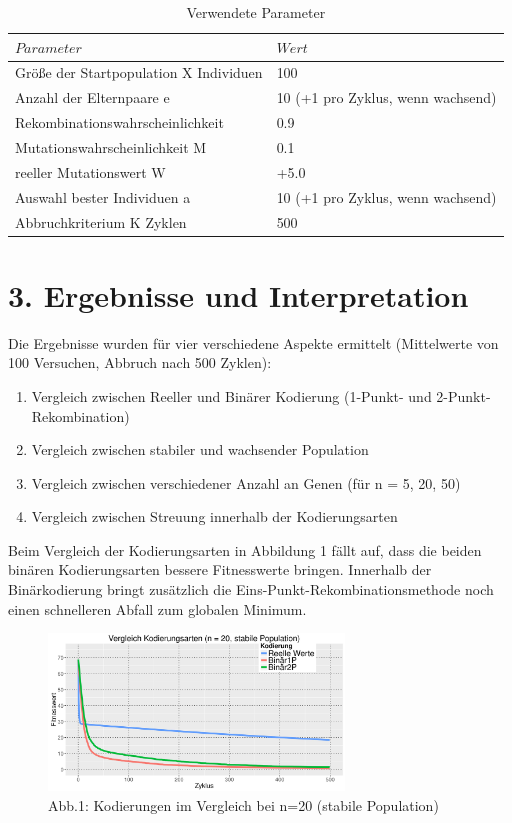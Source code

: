 \documentclass[12pt,
    a4paper,
    headinclude,
    footinclude]{scrreprt}
\begin{document}
\begin{table}[h]
	\centering
	\caption*{Verwendete Parameter}
	\begin{tabularx}{14cm}{|p{9cm}|X|}
		\hline
		$Parameter$ & $Wert$ \\
		\hline
		\hline
		Größe der Startpopulation X Individuen& 100  \\
				\hline
		Anzahl der Elternpaare e & 10 (+1 pro Zyklus, wenn wachsend)  \\
				\hline
		Rekombinationswahrscheinlichkeit& 0.9 \\
				\hline
		Mutationswahrscheinlichkeit M & 0.1 \\
				\hline
		reeller Mutationswert W& +5.0  \\
				\hline
		Auswahl bester Individuen a& 10 (+1 pro Zyklus, wenn wachsend) \\
		\hline
		Abbruchkriterium K Zyklen & 500\\
		\hline
	\end{tabularx}
\end{table}


	
\section*{3. Ergebnisse und Interpretation}	

Die Ergebnisse wurden für vier verschiedene Aspekte ermittelt (Mittelwerte von 100 Versuchen, Abbruch nach 500 Zyklen):

\begin{enumerate}
	\item Vergleich zwischen Reeller und Binärer Kodierung (1-Punkt- und 2-Punkt-Rekombination)
    \item Vergleich zwischen stabiler und wachsender Population
    \item Vergleich zwischen verschiedener Anzahl an Genen (für n = 5, 20, 50)
    \item Vergleich zwischen Streuung innerhalb der Kodierungsarten 
\end{enumerate}

Beim Vergleich der Kodierungsarten in Abbildung 1 fällt auf, dass die beiden binären Kodierungsarten bessere Fitnesswerte bringen. Innerhalb der Binärkodierung bringt zusätzlich die Eins-Punkt-Rekombinationsmethode noch einen schnelleren Abfall zum globalen Minimum. 

\begin{figure}[H]
	\centering
	\includegraphics[width=0.7\textwidth]{../abb1_n20_stable.jpeg} 
	
	\caption*{Abb.1: Kodierungen im Vergleich bei n=20 (stabile Population)} 
	\label{InputOutput}
\end{figure}
\end{document}

